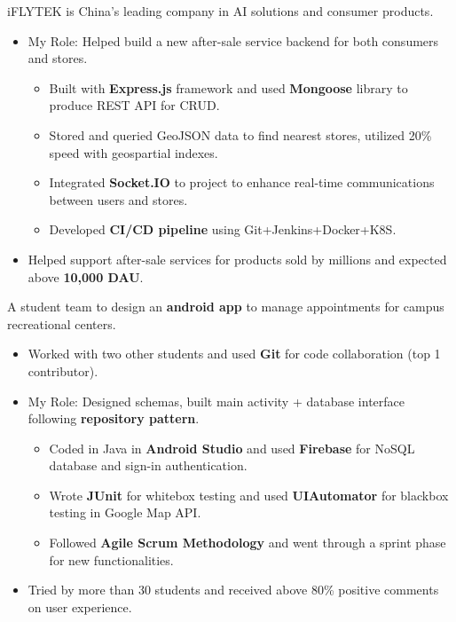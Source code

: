 \documentclass{resume}
\begin{document}
  iFLYTEK is China's leading company in AI solutions and consumer products.
\begin{itemize}
  \item My Role: Helped build a new after-sale service backend for both consumers and stores.
  \begin{itemize}
    \item Built with \textbf{Express.js} framework and used \textbf{Mongoose} library to produce REST API for CRUD.
    \item Stored and queried GeoJSON data to find nearest stores, utilized 20\% speed with geospartial indexes.
    \item Integrated \textbf{Socket.IO} to project to enhance real-time communications between users and stores.
    \item Developed \textbf{CI/CD pipeline} using Git+Jenkins+Docker+K8S.
  \end{itemize}
  \item Helped support after-sale services for products sold by millions and expected above \textbf{10,000 DAU}.
\end{itemize}

  A student team to design an \textbf{android app} to manage appointments for campus recreational centers.
\begin{itemize}
  \item Worked with two other students and used \textbf{Git} for code collaboration (top 1 contributor).
  \item My Role: Designed schemas, built main activity + database interface following \textbf{repository pattern}.
  \begin{itemize}
    \item Coded in Java in \textbf{Android Studio} and used \textbf{Firebase} for NoSQL database and sign-in authentication. 
    \item Wrote \textbf{JUnit} for whitebox testing and used \textbf{UIAutomator} for blackbox testing in Google Map API.
    \item Followed \textbf{Agile Scrum Methodology} and went through a sprint phase for new functionalities.
  \end{itemize}
  \item Tried by more than 30 students and received above 80\% positive comments on user experience.
\end{itemize}
\end{document}
